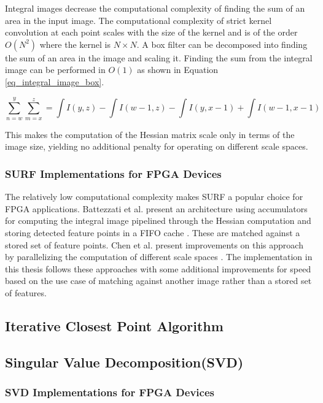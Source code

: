 \documentclass{article}
\begin{document}
Integral images decrease the computational complexity of finding the sum of an area in the input image. The computational complexity of strict kernel convolution at each point scales with the size of the kernel and is of the order $O(N^2)$ where the kernel is $N \times N$. A box filter can be decomposed into finding the sum of an area in the image and scaling it. Finding the sum from the integral image can be performed in $O(1)$ as shown in Equation \ref{eq_integral_image_box}. 

\begin{equation}
\sum\limits_{n=w}^y \sum\limits_{m=x}^z = \int I(y,z) - \int I(w-1,z) - \int I(y,x-1) + \int I(w-1, x-1)
\label{eq_integral_image_box}
\end{equation}

This makes the computation of the Hessian matrix scale only in terms of the image size, yielding no additional penalty for operating on different scale spaces.

\subsubsection{SURF Implementations for FPGA Devices}

The relatively low computational complexity makes SURF a popular choice for FPGA applications. Battezzati et al. present an architecture using accumulators for computing the integral image pipelined through the Hessian computation and storing detected feature points in a FIFO cache \cite{battezzati_surf_2012}. These are matched against a stored set of feature points. Chen et al. present improvements on this approach by parallelizing the computation of different scale spaces \cite{chen_fpga-based_2016}. The implementation in this thesis follows these approaches with some additional improvements for speed based on the use case of matching against another image rather than a stored set of features.

\subsection{Iterative Closest Point Algorithm}

\subsection{Singular Value Decomposition(SVD)}

\subsubsection{SVD Implementations for FPGA Devices}
\end{document}
